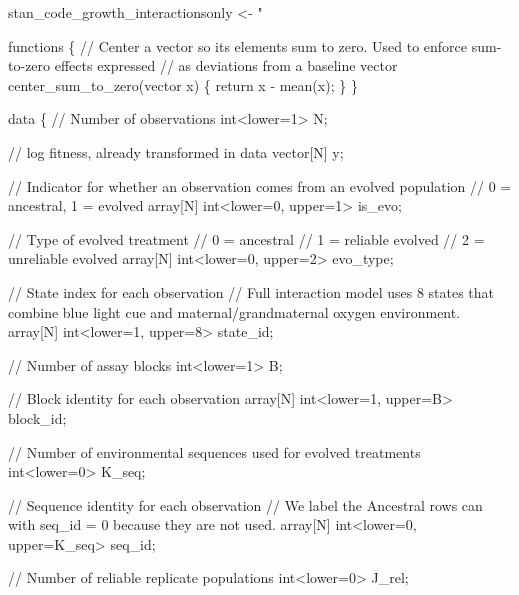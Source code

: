 \documentclass[
]{article}
\newenvironment{Shaded}{\begin{snugshade}}{\end{snugshade}}
\newcommand{\NormalTok}[1]{#1}
\newcommand{\OtherTok}[1]{\textcolor[rgb]{0.56,0.35,0.01}{#1}}
\newcommand{\StringTok}[1]{\textcolor[rgb]{0.31,0.60,0.02}{#1}}
\begin{document}
\begin{Shaded}
\begin{Highlighting}[]
\NormalTok{stan\_code\_growth\_interactionsonly }\OtherTok{\textless{}{-}} \StringTok{"}


\StringTok{functions \{}
\StringTok{  // Center a vector so its elements sum to zero. Used to enforce sum{-}to{-}zero effects expressed}
\StringTok{  // as deviations from a baseline}
\StringTok{  vector center\_sum\_to\_zero(vector x) \{}
\StringTok{    return x {-} mean(x);}
\StringTok{  \}}
\StringTok{\}}

\StringTok{data \{}
\StringTok{  // Number of observations}
\StringTok{  int\textless{}lower=1\textgreater{} N;}

\StringTok{  // log fitness, already transformed in data }
\StringTok{  vector[N] y;}

\StringTok{  // Indicator for whether an observation comes from an evolved population}
\StringTok{  // 0 = ancestral, 1 = evolved}
\StringTok{  array[N] int\textless{}lower=0, upper=1\textgreater{} is\_evo;}

\StringTok{  // Type of evolved treatment}
\StringTok{  // 0 = ancestral }
\StringTok{  // 1 = reliable evolved}
\StringTok{  // 2 = unreliable evolved}
\StringTok{  array[N] int\textless{}lower=0, upper=2\textgreater{} evo\_type;}

\StringTok{  // State index for each observation}
\StringTok{  // Full interaction model uses 8 states that combine blue light cue and maternal/grandmaternal oxygen environment.}
\StringTok{  array[N] int\textless{}lower=1, upper=8\textgreater{} state\_id;}

\StringTok{  // Number of assay blocks}
\StringTok{  int\textless{}lower=1\textgreater{} B;}

\StringTok{  // Block identity for each observation}
\StringTok{  array[N] int\textless{}lower=1, upper=B\textgreater{} block\_id;}

\StringTok{  // Number of environmental sequences used for evolved treatments}
\StringTok{  int\textless{}lower=0\textgreater{} K\_seq;}

\StringTok{  // Sequence identity for each observation}
\StringTok{  // We label the Ancestral rows can with seq\_id = 0 because they are not used.}
\StringTok{  array[N] int\textless{}lower=0, upper=K\_seq\textgreater{} seq\_id;}

\StringTok{  // Number of reliable replicate populations}
\StringTok{  int\textless{}lower=0\textgreater{} J\_rel;}


\end{Highlighting}
\end{Shaded}
\end{document}
